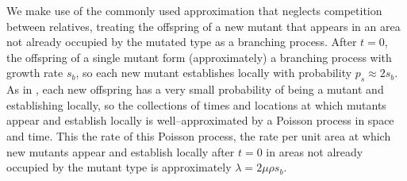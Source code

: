 \documentclass{article}
\begin{document}

We make use of the commonly used approximation that neglects competition between relatives,
treating the offspring of a new mutant that appears in an area not already occupied by the mutated type
as a branching process.
After $t=0$, the offspring of a single mutant form (approximately) a branching process with growth rate $s_b$,
so each new mutant establishes locally with probability $p_s \approx 2s_b$.
As in \cite{ralphcoop2010}, each new offspring has a very small probability of being a mutant and establishing locally,
so the collections of times and locations at which mutants appear and establish locally 
is well--approximated by a Poisson process in space and time.
This the rate of this Poisson process, 
the rate per unit area at which new mutants appear and establish locally after $t=0$ in areas not already occupied by the mutant type
is approximately $\lambda = 2 \mu \rho s_b$.
\end{document}
